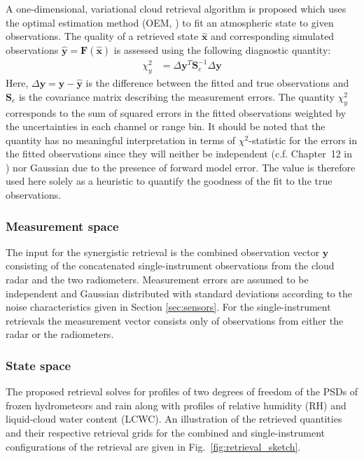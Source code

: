 \documentclass[journal abbreviation, manuscript]{copernicus}
\begin{document}
A one-dimensional, variational cloud retrieval algorithm is proposed which uses
the optimal estimation method (OEM, \cite{rodgers00}) to fit an atmospheric
state to given observations. The quality of a retrieved state $\hat{\mathbf{x}}$
and corresponding simulated observations $\hat{\mathbf{y}} =
\mathbf{F}(\hat{\mathbf{x}})$ is assessed using the following diagnostic
quantity:
%
\begin{align}
\chi^2_y &= \Delta \mathbf{y}^T \mathbf{S}_e^{-1} \Delta \mathbf{y}
\end{align}
%
Here, $\Delta \mathbf{y} = \mathbf{y} - \hat{\mathbf{y}}$ is the difference
between the fitted and true observations and $\mathbf{S}_e$ is the covariance
matrix describing the measurement errors. The quantity $\chi^2_y$ corresponds to
the sum of squared errors in the fitted observations weighted by the
uncertainties in each channel or range bin. It should be noted that the quantity
has no meaningful interpretation in terms of $\chi^2$-statistic for the errors
in the fitted observations since they will neither be independent (c.f.
Chapter~12 in \cite{rodgers00}) nor Gaussian due to the presence of forward
model error. The value is therefore used here solely as a heuristic to quantify
the goodness of the fit to the true observations.

\subsubsection{Measurement space}
\label{sec:orge7dc286}

The input for the synergistic retrieval is the combined observation vector
$\mathbf{y}$ consisting of the concatenated single-instrument observations from
the cloud radar and the two radiometers. Measurement errors are assumed to be
independent and Gaussian distributed with standard deviations according to the
noise characteristics given in Section \ref{sec:sensors}. For the
single-instrument retrievals the measurement vector consists only of
 observations from either the radar or the radiometers.


\subsubsection{State space}
\label{sec:method:state_space}

The proposed retrieval solves for profiles of two degrees of freedom of the PSDs
of frozen hydrometeors and rain along with profiles of relative humidity (RH)
and liquid-cloud water content (LCWC). An illustration of the retrieved
quantities and their respective retrieval grids for the combined and
single-instrument configurations of the retrieval are given in
Fig.~\ref{fig:retrieval_sketch}.
\end{document}
